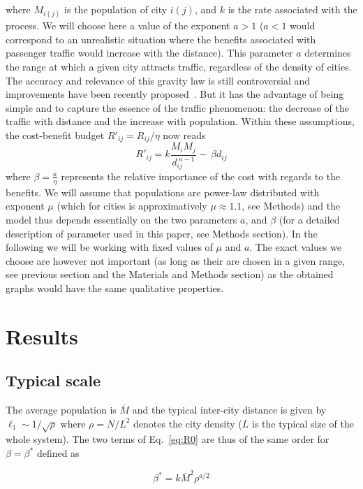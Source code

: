 where $M_{i(j)}$ is the population of city $i(j)$, and $k$ is the rate associated with the process. We will choose here a value of the exponent $a>1$ ($a<1$ would correspond to an unrealistic situation where the benefits associated with passenger traffic would increase with the distance). This parameter $a$ determines the range at which a given city attracts traffic, regardless of the density of cities. The accuracy and relevance of this gravity law is still controversial and improvements have been recently proposed~\cite{Simini:2012,Gargiulo:2012}. But it has the advantage of being simple and to capture the essence of the traffic phenomenon: the decrease of the traffic with distance and the increase with population. Within these assumptions, the cost-benefit budget $R'_{ij}=R_{ij}/\eta$ now reads
\begin{equation}
\label{eq:R0}
R'_{ij} = k\frac{M_i M_j}{d_{ij}^{\;a-1}} - \: \beta d_{ij}
\end{equation}
where $\beta = \frac{\kappa}{\eta}$ represents the relative importance of the cost with regards to the benefits. We will assume that populations are power-law distributed with exponent $\mu$ (which for cities is approximatively $\mu\approx 1.1$, see Methods) and the model thus depends essentially on the two parameters $a$, and $\beta$ (for a detailed description of parameter used in this paper, see Methods section). In the following we will be working with fixed values of $\mu$ and $a$. The exact values we choose are however not important (as long as their are chosen in a given range, see previous section and the Materials and Methods section) as the obtained graphs would have the same qualitative properties.



\section{Results}

\subsection{Typical scale} The average population is $\overline{M}$ and the typical inter-city distance is given by $\ell_1\sim 1/\sqrt{\rho}$ where $\rho=N/L^2$ denotes the city density ($L$ is the typical size of the whole system). The two terms of Eq.~\ref{eq:R0} are thus of the same order for $\beta=\beta^*$ defined as

\begin{equation}
\label{eq:beta*}
\beta^* = k \overline{M}^2 \rho^{a/2}
\end{equation}

